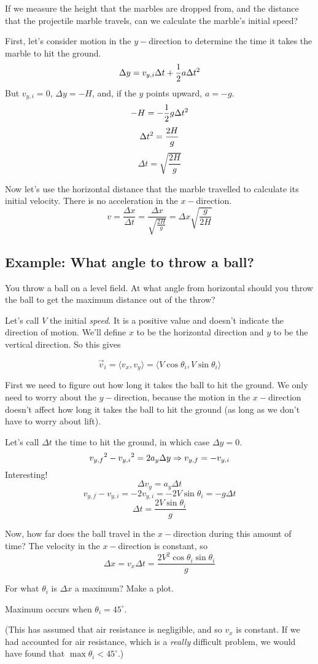 If we measure the height that the marbles are dropped from, and the distance that the projectile marble travels, can we calculate the marble's initial speed?

First, let's consider motion in the $y-$direction to determine the time it takes the marble to hit the ground.
$$\Delta{y}=v_{y,i}\Delta{t}+\frac{1}{2}a\Delta{t}\displaystyle^2$$
But $v_{y,i}=0$, $\Delta{y}=-H$, and, if the $y$ points upward, $a=-g$.
$$-H=-\frac{1}{2}g\Delta{t}\displaystyle^2$$
$$\Delta{t}\displaystyle^2=\frac{2H}{g}$$
$$\Delta{t}=\sqrt{\frac{2H}{g}}$$

Now let's use the horizontal distance that the marble travelled to calculate its initial velocity. There is no acceleration in the $x-$direction.
$$v=\frac{\Delta{x}}{\Delta{t}}=\frac{\Delta{x}}{\sqrt{\frac{2H}{g}}}=\Delta{x}\sqrt{\frac{g}{2H}}$$

\subsection{Example: What angle to throw a ball?}
You throw a ball on a level field. At what angle from horizontal should you throw the ball to get the maximum distance out of the throw?

Let's call $V$ the initial \textit{speed}. It is a positive value and doesn't indicate the direction of motion. We'll define $x$ to be the horizontal direction and $y$ to be the vertical direction. So this gives

$$\vec{v}_i=\langle{v_x,v_y}\rangle=\langle{V\cos\theta_i,V\sin\theta_i}\rangle$$

First we need to figure out how long it takes the ball to hit the ground. We only need to worry about the $y-$direction, because the motion in the $x-$direction doesn't affect how long it takes the ball to hit the ground (as long as we don't have to worry about lift).

Let's call $\Delta{t}$ the time to hit the ground, in which case $\Delta{y}=0$.
$$v_{y,f}\displaystyle^2-v_{y,i}\displaystyle^2=2a_y\Delta{y}\Rightarrow v_{y,f}=-v_{y,i}$$
Interesting!
$$\Delta{v_y}=a_y\Delta{t}$$
$$v_{y,f}-v_{y,i}=-2v_{y,i}=-2V\sin\theta_i=-g\Delta{t}$$
$$\Delta{t}=\frac{2V\sin\theta_i}{g}$$

Now, how far does the ball travel in the $x-$direction during this amount of time? The velocity in the $x-$direction is constant, so
$$\Delta{x}=v_x\Delta{t}=\frac{2V^2\cos\theta_i\sin\theta_i}{g}$$

For what $\theta_i$ is $\Delta{x}$ a maximum? Make a plot.

\vspace{4cm}


Maximum occurs when $\theta_i=45^\circ$.

(This has assumed that air resistance is negligible, and so $v_x$ is constant. If we had accounted for air resistance, which is a \textit{really} difficult problem, we would have found that $\max{\theta_i}<45^\circ$.)

\clearpage
